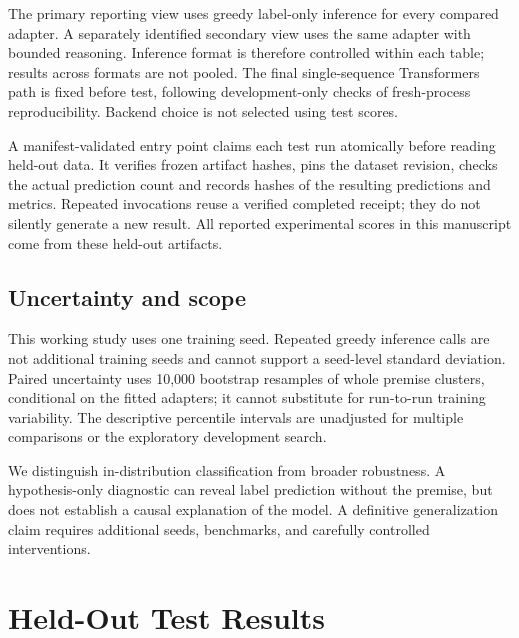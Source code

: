 \documentclass[11pt]{article}
\begin{document}
The primary reporting view uses greedy label-only inference for every compared adapter. A separately identified secondary view uses the same adapter with bounded reasoning. Inference format is therefore controlled within each table; results across formats are not pooled. The final single-sequence Transformers path is fixed before test, following development-only checks of fresh-process reproducibility. Backend choice is not selected using test scores.

A manifest-validated entry point claims each test run atomically before reading held-out data. It verifies frozen artifact hashes, pins the dataset revision, checks the actual prediction count and records hashes of the resulting predictions and metrics. Repeated invocations reuse a verified completed receipt; they do not silently generate a new result. All reported experimental scores in this manuscript come from these held-out artifacts.

\subsection{Uncertainty and scope}
This working study uses one training seed. Repeated greedy inference calls are not additional training seeds and cannot support a seed-level standard deviation. Paired uncertainty uses 10,000 bootstrap resamples of whole premise clusters, conditional on the fitted adapters; it cannot substitute for run-to-run training variability. The descriptive percentile intervals are unadjusted for multiple comparisons or the exploratory development search.

We distinguish in-distribution classification from broader robustness. A hypothesis-only diagnostic can reveal label prediction without the premise, but does not establish a causal explanation of the model. A definitive generalization claim requires additional seeds, benchmarks, and carefully controlled interventions.

\section{Held-Out Test Results}
\end{document}
